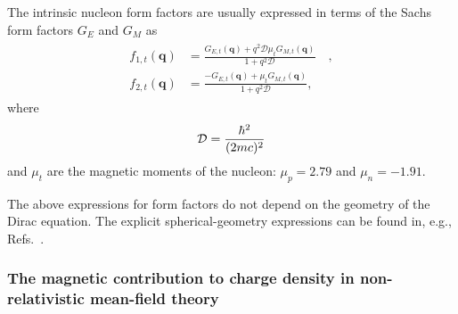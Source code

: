 \documentclass[aps,prc,twocolumn,floatfix,nofootinbib,preprintnumbers,superscriptaddress,longbibliography]{revtex4-1}
\renewcommand{\vec}{\boldsymbol}
\begin{document}
The intrinsic nucleon form factors are usually expressed in terms of
the Sachs form factors  $G_E$ and $G_M$ as
\begin{align}
\begin{aligned}
  f_{1,t}(\vec{q})
  &=
  \frac{G_{E,t}(\vec{q})+{q}^2\mathcal{D}\mu_tG_{M,t}(\vec{q})}{1+{q}^2\mathcal{D}}
  \quad,
\\
  f_{2,t}(\vec{q})
  &=
  \frac{-G_{E,t}(\vec{q})+\mu_tG_{M,t}(\vec{q})}{1+{q}^2\mathcal{D}},
\end{aligned}
\end{align}
where
\begin{equation}
{\cal D}=\frac{\hbar^2}{(2mc)^2}
\end{equation}
and $\mu_{t}$ are the magnetic moments of the nucleon: $\mu_p=2.79$ and $\mu_n = -1.91$.

The above expressions for form factors do not depend on the geometry of the Dirac equation. 
 The explicit spherical-geometry expressions can be found in, e.g.,  Refs.~\cite{Horowitz2012,Kurasawa2019}.

\subsubsection{The magnetic contribution to charge density in non-relativistic mean-field theory}
\end{document}
